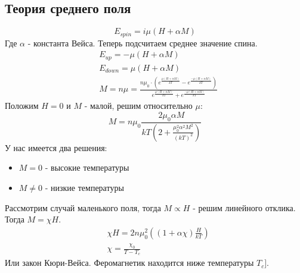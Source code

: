 \documentclass[a4paper, 12pt]{article}
\begin{document}
	\subsection{Теория среднего поля}
	\begin{equation*}
		E_{spin} = i \mu (H + \alpha M)
	\end{equation*}
	Где $\alpha$ - константа Вейса. Теперь подсчитаем среднее значение спина. 
	\begin{equation*}
		\begin{aligned}
			& E_{up} = - \mu (H + \alpha M)                                                                                                                                                          \\
			& E_{down} = \mu (H + \alpha M)                                                                                                                                                          \\
			& M = n \mu =\frac{ n \mu_{0} \cdot (  e^{\frac{\mu (H+ \alpha M)}{kT}}  -  e^{\frac{-\mu (H+ \alpha M)}{kT}})} {e^{\frac{\mu (H+ \alpha M)}{kT}}  +  e^{\frac{-\mu (H+ \alpha M)}{kT}}} 
		\end{aligned}
	\end{equation*}
	Положим $H=0$ и $M$ - малой, решим относительно $\mu$:
	\begin{equation*}
		M = n \mu_{0} \frac{2 \mu_{0} \alpha M}{kT(2+\frac{ \mu_{0} ^{2} \alpha^2 M^2}{(kT)^2}) }
	\end{equation*}
	У нас имеется два решения:
	\begin{itemize}
		\item $M = 0$ - высокие температуры
		\item $M \neq 0$ - низкие температуры
	\end{itemize}
	Рассмотрим случай маленького поля, тогда $M \propto H$ - решим линейного отклика. Тогда $M = \chi H$. 
	\begin{equation*}
		\begin{aligned}
			& \chi H = 2n \mu_{0}^{2} ( (1+\alpha \chi)\frac{H}{kT}) \\
			& \chi = \frac{\chi_{0}} {T-T_{c}}                       
		\end{aligned}
	\end{equation*}
	Или закон Кюри-Вейса.
	Феромагнетик находится ниже температуры $T_{c}]$.
\end{document}

